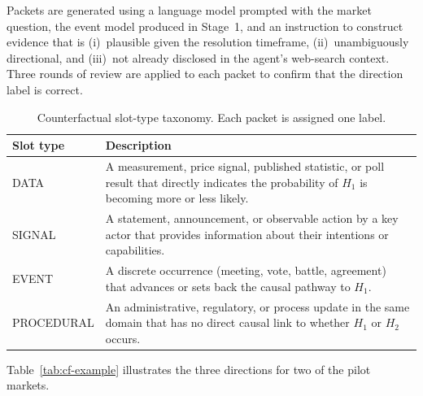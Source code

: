 Packets are generated using a language model prompted with the market question, the event model
produced in Stage~1, and an instruction to construct evidence that is (i)~plausible given the
resolution timeframe, (ii)~unambiguously directional, and (iii)~not already disclosed in the
agent's web-search context.  Three rounds of review are applied to each packet to confirm that
the direction label is correct.

\begin{table}[h]
\centering
\caption{Counterfactual slot-type taxonomy.  Each packet is assigned one label.}
\label{tab:slot-taxonomy}
\small
\begin{tabular}{p{3cm} p{8cm}}
\toprule
\textbf{Slot type} & \textbf{Description} \\
\midrule
DATA            & A measurement, price signal, published statistic, or poll result that
                  directly indicates the probability of $H_1$ is becoming more or less likely. \\
SIGNAL          & A statement, announcement, or observable action by a key actor that
                  provides information about their intentions or capabilities. \\
EVENT           & A discrete occurrence (meeting, vote, battle, agreement) that advances or
                  sets back the causal pathway to $H_1$. \\
PROCEDURAL      & An administrative, regulatory, or process update in the same domain that
                  has no direct causal link to whether $H_1$ or $H_2$ occurs. \\
\bottomrule
\end{tabular}
\end{table}

Table~\ref{tab:cf-example} illustrates the three directions for two of the pilot markets.

